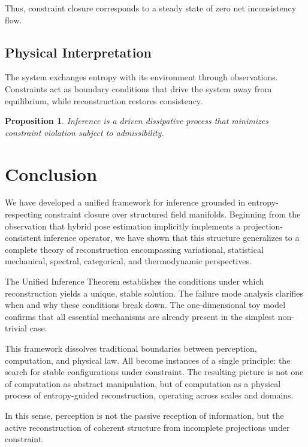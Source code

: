 \documentclass[12pt]{article}
\newtheorem{proposition}{Proposition}
\begin{document}
Thus, constraint closure corresponds to a steady state of zero net inconsistency flow.

\subsection{Physical Interpretation}

The system exchanges entropy with its environment through observations. Constraints act as boundary conditions that drive the system away from equilibrium, while reconstruction restores consistency.

\begin{proposition}
Inference is a driven dissipative process that minimizes constraint violation subject to admissibility.
\end{proposition}

\section{Conclusion}

We have developed a unified framework for inference grounded in entropy-respecting constraint closure over structured field manifolds. Beginning from the observation that hybrid pose estimation implicitly implements a projection-consistent inference operator, we have shown that this structure generalizes to a complete theory of reconstruction encompassing variational, statistical mechanical, spectral, categorical, and thermodynamic perspectives.

The Unified Inference Theorem establishes the conditions under which reconstruction yields a unique, stable solution. The failure mode analysis clarifies when and why these conditions break down. The one-dimensional toy model confirms that all essential mechanisms are already present in the simplest non-trivial case.

This framework dissolves traditional boundaries between perception, computation, and physical law. All become instances of a single principle: the search for stable configurations under constraint. The resulting picture is not one of computation as abstract manipulation, but of computation as a physical process of entropy-guided reconstruction, operating across scales and domains.

In this sense, perception is not the passive reception of information, but the active reconstruction of coherent structure from incomplete projections under constraint.

\newpage 
\end{document}
